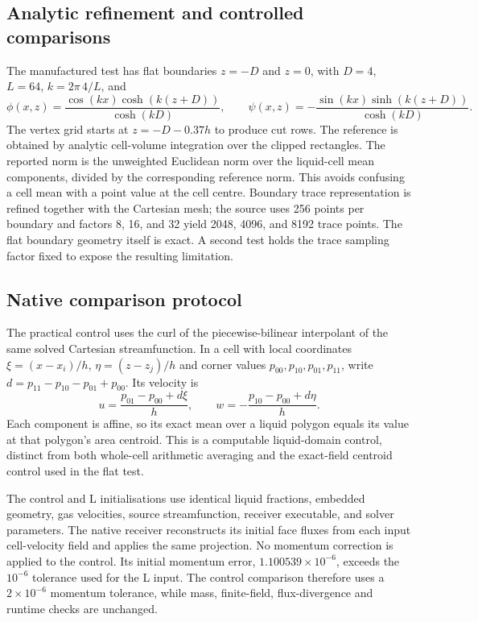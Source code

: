 \documentclass[10pt]{article}
\begin{document}
\subsection{Analytic refinement and controlled comparisons}
The manufactured test has flat boundaries $z=-D$ and $z=0$, with
$D=4$, $L=64$, $k=2\pi\,4/L$, and
\begin{equation}
 \phi(x,z)=\frac{\cos(kx)\cosh(k(z+D))}{\cosh(kD)},\qquad
 \psi(x,z)=-\frac{\sin(kx)\sinh(k(z+D))}{\cosh(kD)}.
 \label{eq:manufactured-f4}
\end{equation}
The vertex grid starts at $z=-D-0.37h$ to produce cut rows. The reference
is obtained by analytic cell-volume integration over the clipped rectangles.
The reported norm is the unweighted Euclidean norm over the liquid-cell mean
components, divided by the corresponding reference norm. This avoids
confusing a cell mean with a point value at the cell centre. Boundary trace
representation is refined together with the Cartesian mesh; the source uses
256 points per boundary and factors 8, 16, and 32 yield 2048, 4096, and 8192
trace points. The flat boundary geometry itself is exact. A second test
holds the trace sampling factor fixed to expose the resulting limitation.

\subsection{Native comparison protocol}
The practical control uses the curl of the piecewise-bilinear interpolant
of the same solved Cartesian streamfunction. In a cell with local coordinates
$\xi=(x-x_i)/h$, $\eta=(z-z_j)/h$ and corner values $p_{00},p_{10},p_{01},p_{11}$,
write $d=p_{11}-p_{10}-p_{01}+p_{00}$. Its velocity is
\begin{equation}
 u=\frac{p_{01}-p_{00}+d\xi}{h},\qquad
 w=-\frac{p_{10}-p_{00}+d\eta}{h}.
\end{equation}
Each component is affine, so its exact mean over a liquid polygon equals
its value at that polygon's area centroid. This is a computable
liquid-domain control, distinct from both whole-cell arithmetic averaging
and the exact-field centroid control used in the flat test.

The control and L initialisations use identical liquid fractions,
embedded geometry, gas velocities, source streamfunction, receiver executable,
and solver parameters. The native receiver reconstructs its initial face
fluxes from each input cell-velocity field and applies the same projection.
No momentum correction is applied to the control. Its initial momentum
error, $1.100539\times10^{-6}$, exceeds the $10^{-6}$ tolerance used for
the L input. The control comparison therefore uses a $2\times10^{-6}$
momentum tolerance, while mass, finite-field, flux-divergence and runtime
checks are unchanged.
\end{document}

